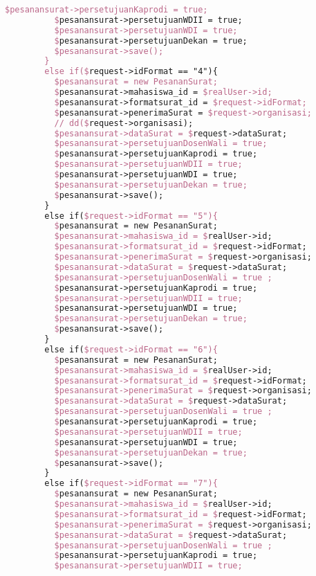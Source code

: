 \begin{lstlisting}[language=tex,basicstyle=\tiny,caption=PesanansuratController.php]
          $pesanansurat->persetujuanKaprodi = true;
          $pesanansurat->persetujuanWDII = true;
          $pesanansurat->persetujuanWDI = true;
          $pesanansurat->persetujuanDekan = true;
          $pesanansurat->save();
        }
        else if($request->idFormat == "4"){
          $pesanansurat = new PesananSurat;
          $pesanansurat->mahasiswa_id = $realUser->id;
          $pesanansurat->formatsurat_id = $request->idFormat;
          $pesanansurat->penerimaSurat = $request->organisasi;
          // dd($request->organisasi);
          $pesanansurat->dataSurat = $request->dataSurat;
          $pesanansurat->persetujuanDosenWali = true;
          $pesanansurat->persetujuanKaprodi = true;
          $pesanansurat->persetujuanWDII = true;
          $pesanansurat->persetujuanWDI = true;
          $pesanansurat->persetujuanDekan = true;
          $pesanansurat->save();
        }
        else if($request->idFormat == "5"){
          $pesanansurat = new PesananSurat;
          $pesanansurat->mahasiswa_id = $realUser->id;
          $pesanansurat->formatsurat_id = $request->idFormat;
          $pesanansurat->penerimaSurat = $request->organisasi;
          $pesanansurat->dataSurat = $request->dataSurat;
          $pesanansurat->persetujuanDosenWali = true ;
          $pesanansurat->persetujuanKaprodi = true;
          $pesanansurat->persetujuanWDII = true;
          $pesanansurat->persetujuanWDI = true;
          $pesanansurat->persetujuanDekan = true;
          $pesanansurat->save();
        }
        else if($request->idFormat == "6"){
          $pesanansurat = new PesananSurat;
          $pesanansurat->mahasiswa_id = $realUser->id;
          $pesanansurat->formatsurat_id = $request->idFormat;
          $pesanansurat->penerimaSurat = $request->organisasi;
          $pesanansurat->dataSurat = $request->dataSurat;
          $pesanansurat->persetujuanDosenWali = true ;
          $pesanansurat->persetujuanKaprodi = true;
          $pesanansurat->persetujuanWDII = true;
          $pesanansurat->persetujuanWDI = true;
          $pesanansurat->persetujuanDekan = true;
          $pesanansurat->save();
        }
        else if($request->idFormat == "7"){
          $pesanansurat = new PesananSurat;
          $pesanansurat->mahasiswa_id = $realUser->id;
          $pesanansurat->formatsurat_id = $request->idFormat;
          $pesanansurat->penerimaSurat = $request->organisasi;
          $pesanansurat->dataSurat = $request->dataSurat;
          $pesanansurat->persetujuanDosenWali = true ;
          $pesanansurat->persetujuanKaprodi = true;
          $pesanansurat->persetujuanWDII = true;

\end{lstlisting}

